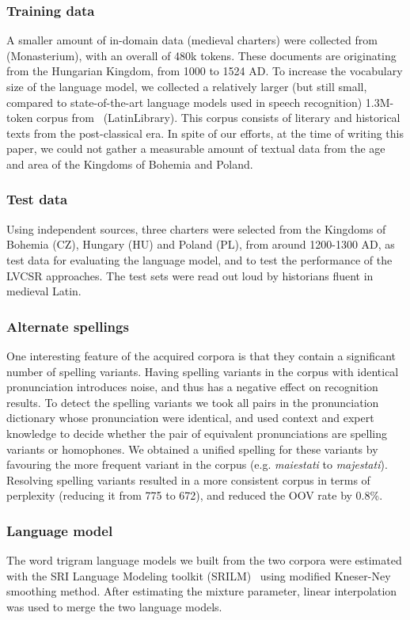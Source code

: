 \documentclass[runningheads,a4paper]{llncs}
\begin{document}
\subsubsection{Training data}\label{traintext}
A smaller amount of in-domain data (medieval charters) were collected from~\cite{monasterium} (Monasterium), with an overall of 480k tokens.
These documents are originating from the Hungarian Kingdom, from 1000 to 1524 AD.
To increase the vocabulary size of the language model, we collected a relatively larger (but still small, compared to state-of-the-art language models used in speech recognition) 1.3M-token corpus from~\cite{latinlibrary} (LatinLibrary).
This corpus consists of literary and historical texts from the post-classical era.
In spite of our efforts, at the time of writing this paper, we could not gather a measurable amount of textual data from the age and area of the Kingdoms of Bohemia and Poland.
\subsubsection{Test data}\label{testtext}
Using independent sources, three charters were selected from the Kingdoms of Bohemia (CZ), Hungary (HU) and Poland (PL), from around 1200-1300 AD, as test data for evaluating the language model, and to test the performance of the LVCSR approaches.
The test sets were read out loud by historians fluent in medieval Latin.
\subsubsection{Alternate spellings}
One interesting feature of the acquired corpora is that they contain a significant number of spelling variants.
Having spelling variants in the corpus with identical pronunciation introduces noise, and thus has a negative effect on recognition results.
To detect the spelling variants we took all pairs in the pronunciation dictionary whose pronunciation were identical, and used context and expert knowledge to decide whether the pair of equivalent pronunciations are spelling variants or homophones.
We obtained a unified spelling for these variants by favouring the more frequent variant in the corpus (e.g. \textit{maiestati} to \textit{majestati}).
Resolving spelling variants resulted in a more consistent corpus in terms of perplexity (reducing it from 775 to 672), and reduced the OOV rate by 0.8\%.
\subsubsection{Language model}
The word trigram language models we built from the two corpora were estimated with the SRI Language Modeling toolkit (SRILM)~\cite{srilm} using modified Kneser-Ney smoothing method.
After estimating the mixture parameter, linear interpolation was used to merge the two language models.
\end{document}
